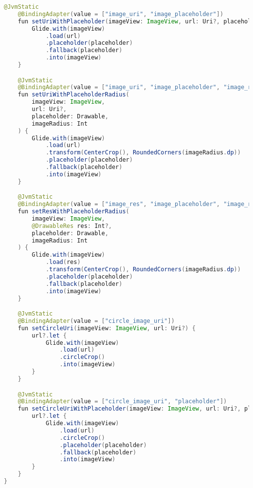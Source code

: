 \begin{asection}
\begin{lstlisting}[language=Java,label={lst:add:a_9}, caption={AhriMessagingService}, caption={PreferenceDataSource}]
    @JvmStatic
    @BindingAdapter(value = ["image_uri", "image_placeholder"])
    fun setUriWithPlaceholder(imageView: ImageView, url: Uri?, placeholder: Drawable) {
        Glide.with(imageView)
            .load(url)
            .placeholder(placeholder)
            .fallback(placeholder)
            .into(imageView)
    }

    @JvmStatic
    @BindingAdapter(value = ["image_uri", "image_placeholder", "image_radius"])
    fun setUriWithPlaceholderRadius(
        imageView: ImageView,
        url: Uri?,
        placeholder: Drawable,
        imageRadius: Int
    ) {
        Glide.with(imageView)
            .load(url)
            .transform(CenterCrop(), RoundedCorners(imageRadius.dp))
            .placeholder(placeholder)
            .fallback(placeholder)
            .into(imageView)
    }

    @JvmStatic
    @BindingAdapter(value = ["image_res", "image_placeholder", "image_radius"])
    fun setResWithPlaceholderRadius(
        imageView: ImageView,
        @DrawableRes res: Int?,
        placeholder: Drawable,
        imageRadius: Int
    ) {
        Glide.with(imageView)
            .load(res)
            .transform(CenterCrop(), RoundedCorners(imageRadius.dp))
            .placeholder(placeholder)
            .fallback(placeholder)
            .into(imageView)
    }

    @JvmStatic
    @BindingAdapter(value = ["circle_image_uri"])
    fun setCircleUri(imageView: ImageView, url: Uri?) {
        url?.let {
            Glide.with(imageView)
                .load(url)
                .circleCrop()
                .into(imageView)
        }
    }

    @JvmStatic
    @BindingAdapter(value = ["circle_image_uri", "placeholder"])
    fun setCircleUriWithPlaceholder(imageView: ImageView, url: Uri?, placeholder: Drawable) {
        url?.let {
            Glide.with(imageView)
                .load(url)
                .circleCrop()
                .placeholder(placeholder)
                .fallback(placeholder)
                .into(imageView)
        }
    }
}
\end{lstlisting}
\end{asection}

